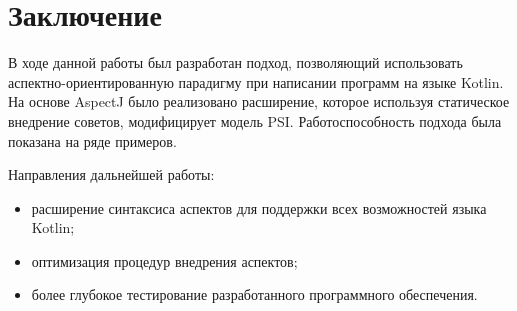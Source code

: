 \documentclass[conference]{IEEEtran}
\begin{document}


\section{Заключение}

В ходе данной работы был разработан подход, позволяющий использовать
аспектно-ориентированную парадигму при написании программ на языке Kotlin.
На основе AspectJ было реализовано расширение, которое используя статическое 
внедрение советов, модифицирует модель PSI.
Работоспособность подхода была показана на ряде примеров.

Направления дальнейшей работы:
\begin{itemize}
    \item расширение синтаксиса аспектов для поддержки всех возможностей языка
          Kotlin;
    \item оптимизация процедур внедрения аспектов;
    \item более глубокое тестирование разработанного программного обеспечения.
\end{itemize}
\end{document}
